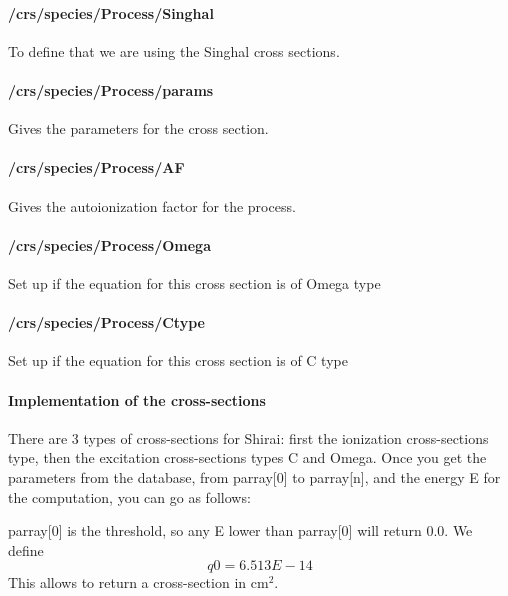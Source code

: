 \paragraph{/crs/species/Process/Singhal} To define that we are using the Singhal cross sections. 
\paragraph{/crs/species/Process/params} Gives the parameters for the cross section.
\paragraph{/crs/species/Process/AF} Gives the autoionization factor for the process.
\paragraph{/crs/species/Process/Omega} Set up if the equation for this cross section is of Omega type
\paragraph{/crs/species/Process/Ctype} Set up if the equation for this cross section is of C type

\paragraph{Implementation of the cross-sections}
There are 3 types of cross-sections for Shirai: first the ionization cross-sections type, then the excitation cross-sections types C and Omega. 
Once you get the parameters from the database, from parray[0] to parray[n], and the energy E for the computation, you can go as follows:

parray[0] is the threshold, so any E lower than parray[0] will return 0.0.
We define
\begin{equation}
    q0=6.513E-14
\end{equation}
This allows to return a cross-section in cm$^2$.

